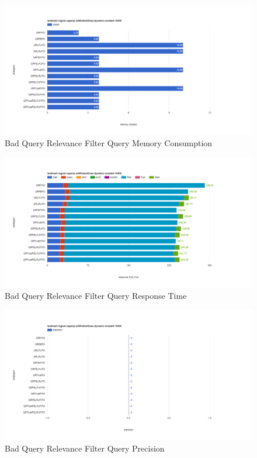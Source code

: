 \begin{figure}[!htbp]
    \centering
    \includegraphics[width=\textwidth]{img/app3-bqr-m.png}
    \caption{Bad Query Relevance Filter Query Memory Consumption}
\end{figure}
\begin{figure}[!htbp]
    \centering
    \includegraphics[width=\textwidth]{img/app3-bqr-r.png}
    \caption{Bad Query Relevance Filter Query Response Time}
\end{figure}
\begin{figure}[!htbp]
    \centering
    \includegraphics[width=\textwidth]{img/app3-bqr-p.png}
    \caption{Bad Query Relevance Filter Query Precision}
\end{figure}
